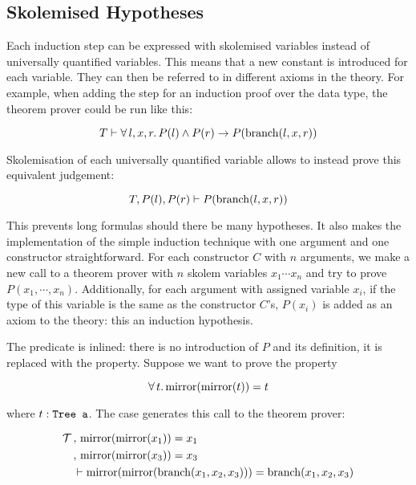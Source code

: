 \subsection{Skolemised Hypotheses}

Each induction step can be expressed with skolemised variables instead
of universally quantified variables. This means that a new constant is
introduced for each variable. They can then be referred to in
different axioms in the theory. For example, when adding the
 step for an induction proof over the  data type,
the theorem prover could be run like this:

\begin{equation*}
T \vdash \forall \, l , x , r . \, P(l) \wedge P(r) \rightarrow P(\mathrm{branch}(l,x,r))
\end{equation*}

Skolemisation of each universally quantified variable allows to
instead prove this equivalent judgement:

\begin{equation*}
T , P(l) , P(r) \vdash P(\mathrm{branch}(l,x,r))
\end{equation*}

This prevents long formulas should there be many hypotheses.  It also
makes the implementation of the simple induction technique with one
argument and one constructor straightforward. For each constructor $C$
with $n$ arguments, we make a new call to a theorem prover with $n$
skolem variables $x_1 \cdots x_n$ and try to prove
$P(x_1,\cdots,x_n)$.  Additionally, for each argument with assigned
variable $x_i$, if the type of this variable is the same as the
constructor $C$'s, $P(x_i)$ is added as an axiom to the theory: this
an induction hypothesis.

The predicate is inlined: there is no introduction of $P$ and its
definition, it is replaced with the property. Suppose we want to prove
the property

$$\forall \, t . \, \mathrm{mirror}(\mathrm{mirror}(t)) = t$$

where $t : \texttt{Tree a}$. The  case generates this call to
the theorem prover:

\begin{align*}
\mathcal{T} \, & , \, \mathrm{mirror} (\mathrm{mirror} (x_1)) = x_1 \\
            \, & , \, \mathrm{mirror} (\mathrm{mirror} (x_3)) = x_3 \\
               &\vdash \mathrm{mirror} (\mathrm{mirror} (\mathrm{branch}( x_1, x_2, x_3))) = \mathrm{branch}(  x_1, x_2, x_3)
\end{align*}

